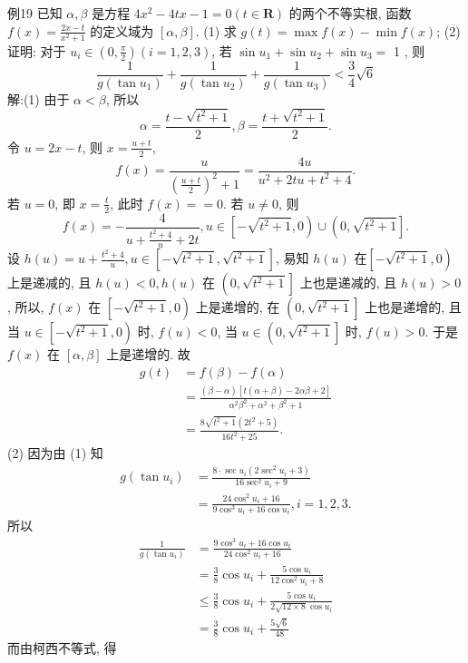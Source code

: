 例19 已知 $\alpha, \beta$ 是方程 $4 x^2-4 t x-1=0(t \in \mathbf{R})$ 的两个不等实根, 函数 $f(x)=\frac{2 x-t}{x^2+1}$ 的定义域为 $[\alpha, \beta]$.
(1) 求 $g(t)=\max f(x)-\min f(x)$;
(2) 证明: 对于 $u_i \in\left(0, \frac{\pi}{2}\right)(i=1,2,3)$, 若 $\sin u_1+\sin u_2+\sin u_3=$ 1 , 则
$$
\frac{1}{g\left(\tan u_1\right)}+\frac{1}{g\left(\tan u_2\right)}+\frac{1}{g\left(\tan u_3\right)}<\frac{3}{4} \sqrt{6}
$$
解:(1) 由于 $\alpha<\beta$, 所以
$$
\alpha=\frac{t-\sqrt{t^2+1}}{2}, \beta=\frac{t+\sqrt{t^2+1}}{2} .
$$
令 $u=2 x-t$, 则 $x=\frac{u+t}{2}$,
$$
f(x)=\frac{u}{\left(\frac{u+t}{2}\right)^2+1}=\frac{4 u}{u^2+2 t u+t^2+4} .
$$
若 $u=0$, 即 $x=\frac{t}{2}$, 此时 $f(x)==0$.
若 $u \neq 0$, 则
$$
f(x)=-\frac{4}{u+\frac{t^2+4}{u}+2 t}, u \in\left[-\sqrt{t^2+1}, 0\right) \cup\left(0, \sqrt{t^2+1}\right] .
$$
设 $h(u)=u+\frac{t^2+4}{u}, u \in\left[-\sqrt{t^2+1}, \sqrt{t^2+1}\right]$, 易知 $h(u)$ 在$\left[-\sqrt{t^2+1}, 0\right)$ 上是递减的, 且 $h(u)<0, h(u)$ 在 $\left(0, \sqrt{t^2+1}\right]$ 上也是递减的, 且 $h(u)>0$, 所以, $f(x)$ 在 $\left[-\sqrt{t^2+1}, 0\right)$ 上是递增的, 在 $\left(0, \sqrt{t^2+1}\right]$ 上也是递增的, 且当 $u \in\left[-\sqrt{t^2+1}, 0\right)$ 时, $f(u)<0$, 当 $u \in\left(0, \sqrt{t^2+1}\right]$ 时, $f(u)>0$. 于是 $f(x)$ 在 $[\alpha, \beta]$ 上是递增的.
故
$$
\begin{aligned}
g(t) & =f(\beta)-f(\alpha) \\
& =\frac{(\beta-\alpha)[t(\alpha+\beta)-2 \alpha \beta+2]}{\alpha^2 \beta^2+\alpha^2+\beta^2+1} \\
& =\frac{8 \sqrt{t^2+1}\left(2 t^2+5\right)}{16 t^2+25} .
\end{aligned}
$$
(2) 因为由 (1) 知
$$
\begin{aligned}
g\left(\tan u_i\right) & =\frac{8 \cdot \sec u_i\left(2 \sec ^2 u_i+3\right)}{16 \sec ^2 u_i+9} \\
& =\frac{24 \cos ^2 u_i+16}{9 \cos ^3 u_i+16 \cos u_i}, i=1,2,3 .
\end{aligned}
$$
所以
$$
\begin{aligned}
\frac{1}{g\left(\tan u_i\right)} & =\frac{9 \cos ^3 u_i+16 \cos u_i}{24 \cos ^2 u_i+16} \\
& =\frac{3}{8} \cos u_i+\frac{5 \cos u_i}{12 \cos ^2 u_i+8} \\
& \leqslant \frac{3}{8} \cos u_i+\frac{5 \cos u_i}{2 \sqrt{12 \times 8} \cos u_i} \\
& =\frac{3}{8} \cos u_i+\frac{5 \sqrt{6}}{48}
\end{aligned}
$$
而由柯西不等式, 得
